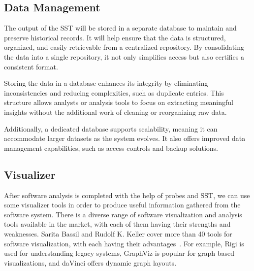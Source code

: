 \subsection{Data Management}

The output of the SST will be stored in a separate database to maintain and preserve historical records. It will help ensure that the data is structured, organized, and easily retrievable from a centralized repository. By consolidating the data into a single repository, it not only simplifies access but also certifies a consistent format. 

Storing the data in a database enhances its integrity by eliminating inconsistencies and reducing complexities, such as duplicate entries. This structure allows analysts or analysis tools to focus on extracting meaningful insights without the additional work of cleaning or reorganizing raw data.

Additionally, a dedicated database supports scalability, meaning it can accommodate larger datasets as the system evolves. It also offers improved data management capabilities, such as access controls and backup solutions.

\subsection{Visualizer}\label{sec:component-visualizer}

After software analysis is completed with the help of probes and SST, we can use some visualizer tools in order to produce useful information gathered from the software system. There is a diverse range of software visualization and analysis tools available in the market, with each of them having their strengths and weaknesses. Sarita Bassil and Rudolf K. Keller cover more than 40 tools for software visualization, with each having their advantages~\citep{SWVizTools2001}. For example, Rigi is used for understanding legacy systems, GraphViz is popular for graph-based visualizations, and daVinci offers dynamic graph layouts.

